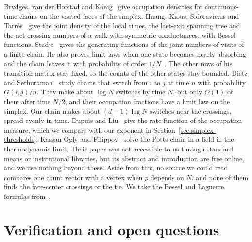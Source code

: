 \documentclass[11pt]{article}
\theoremstyle{definition}
\theoremstyle{remark}
\begin{document}
Brydges, van der Hofstad and K\"onig~\cite{brydges2007} give occupation
densities for continuous-time chains on the visited faces of the simplex.
Huang, Kious, Sidoravicius and Tarr\'es~\cite[Theorem~1]{huang2018} give the
joint density of the local times, the last-exit spanning tree and the net
crossing numbers of a walk with symmetric conductances, with Bessel functions. Stadje~\cite[Theorems~1 and~2]{stadje1999} gives the generating
functions of the joint numbers of visits of a finite chain. He also proves limit
laws when one state becomes nearly absorbing and the chain leaves it with
probability of order $1/N$~\cite[Theorems~3 and~4]{stadje1999}. The other rows
of his transition matrix stay fixed, so the counts of the other states stay
bounded. Dietz and Sethuraman~\cite{dietz2007} study chains that switch from
$i$ to $j$ at time $n$ with probability $G(i,j)/n$. They make about $\log N$
switches by time $N$, but only $O(1)$ of them after time $N/2$, and their
occupation fractions have a limit law on the simplex. Our chain makes about
$(d-1)\log N$ switches near the crossings, spread evenly in time. Dupuis and Liu~\cite{dupuisliu2015} give the rate function of
the occupation measure, which we compare with our exponent in
Section~\ref{sec:simplex-thresholds}. Kassan-Ogly and
Filippov~\cite{kassanogly2003} solve the Potts chain in a field in the
thermodynamic limit. Their paper was not accessible to us through standard
means or institutional libraries, but its abstract and introduction are free
online, and we use nothing beyond these. Aside from this, no source we could
read compares one count vector with a vertex when $p$ depends on $N$, and none
of them finds the face-center crossings or the tie.
We take the Bessel and Laguerre formulas from~\cite{dlmf}.







\section{Verification and open questions}\label{sec:verify}
\end{document}
